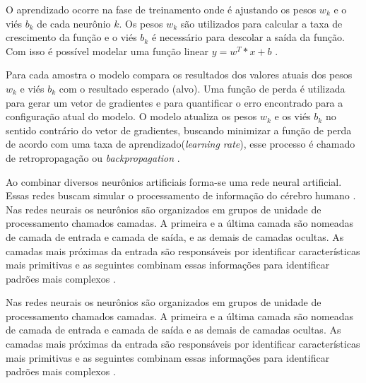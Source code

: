 O aprendizado ocorre na fase de treinamento onde é ajustando os pesos $w_k$ e o viés $b_k$ de cada neurônio $k$. Os pesos $w_k$ são utilizados para calcular a taxa de crescimento da função e o viés $b_k$ é necessário para descolar a saída da função. Com isso é possível modelar uma função linear $y=w^T*x+b$ \cite{marti2017aprendizado}.

Para cada amostra o modelo compara os resultados dos valores atuais dos pesos $w_k$ e viés $b_k$ com o resultado esperado (alvo). Uma função de perda é utilizada para gerar um vetor de gradientes e para quantificar o erro encontrado para a configuração atual do modelo. O modelo atualiza os pesos $w_k$ e os viés $b_k$ no sentido contrário do vetor de gradientes, buscando minimizar a função de perda de acordo com uma taxa de aprendizado(\textit{learning rate}), esse processo é chamado de retropropagação ou \textit{backpropagation} \cite{marti2017aprendizado}.

Ao combinar diversos neurônios artificiais forma-se uma rede neural artificial. Essas redes buscam simular o processamento de informação do cérebro humano \cite{ferneda2006redes}.
Nas redes neurais os neurônios são organizados em grupos de unidade de processamento chamados camadas. A primeira e a última camada são nomeadas de camada de entrada e camada de saída, e as demais de camadas ocultas. As camadas mais próximas da entrada são responsáveis por identificar características mais primitivas e as seguintes combinam essas informações para identificar padrões mais complexos \cite{marti2017aprendizado}.

Nas redes neurais os neurônios são organizados em grupos de unidade de processamento chamados camadas. A primeira e a última camada são nomeadas de camada de entrada e camada de saída e as demais de camadas ocultas. As camadas mais próximas da entrada são responsáveis por identificar características mais primitivas e as seguintes combinam essas informações para identificar padrões mais complexos \cite{marti2017aprendizado}.

